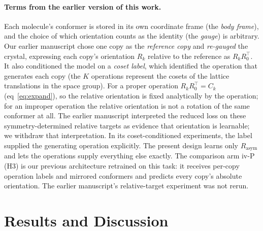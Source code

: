 \documentclass[journal=acsodf,manuscript=article]{achemso}
\begin{document}
\paragraph{Terms from the earlier version of this work.} Each molecule's conformer is
stored in its own coordinate frame (the \emph{body frame}), and the choice of which
orientation counts as the identity (the \emph{gauge}) is arbitrary. Our earlier manuscript
chose one copy as the \emph{reference copy} and \emph{re-gauged} the crystal, expressing
each copy's orientation $R_k$ relative to the reference as $R_kR_0^{\top}$. It also
conditioned the model on a \emph{coset label}, which identified the operation that generates
each copy (the $K$ operations represent the cosets of the lattice translations in the space
group). For a proper operation $R_kR_0^{\top}=C_k$ (eq~\ref{eq:expand}), so the relative
orientation is fixed analytically by the operation; for an improper operation the relative
orientation is not a rotation of the same conformer at all. The earlier manuscript
interpreted the reduced loss on these symmetry-determined relative targets as evidence that
orientation is learnable; we withdraw that interpretation. In its coset-conditioned
experiments, the label supplied the generating operation explicitly. The present design learns only $R_{\text{asym}}$ and lets the
operations supply everything else exactly. The comparison arm iv-P (H3) is our previous
architecture retrained on this task: it receives per-copy operation labels and mirrored
conformers and predicts every copy's absolute orientation. The earlier manuscript's
relative-target experiment was not rerun.

\section{Results and Discussion}
\end{document}
